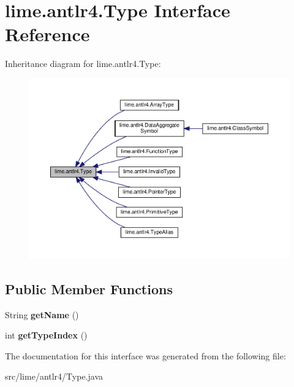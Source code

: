\hypertarget{interfacelime_1_1antlr4_1_1Type}{}\section{lime.\+antlr4.\+Type Interface Reference}
\label{interfacelime_1_1antlr4_1_1Type}


Inheritance diagram for lime.\+antlr4.\+Type\+:
\nopagebreak
\begin{figure}[H]
\begin{center}
\leavevmode
\includegraphics[width=350pt]{interfacelime_1_1antlr4_1_1Type__inherit__graph}
\end{center}
\end{figure}
\subsection*{Public Member Functions}
\begin{DoxyCompactItemize}
\item 
\mbox{\label{interfacelime_1_1antlr4_1_1Type_ad45768fa6bb295f46183b36fe82d3cc6}} 
String {\bfseries get\+Name} ()
\item 
\mbox{\label{interfacelime_1_1antlr4_1_1Type_aacc9255e1b185e4f14e1db47cadf7527}} 
int {\bfseries get\+Type\+Index} ()
\end{DoxyCompactItemize}


The documentation for this interface was generated from the following file\+:\begin{DoxyCompactItemize}
\item 
src/lime/antlr4/Type.\+java\end{DoxyCompactItemize}
